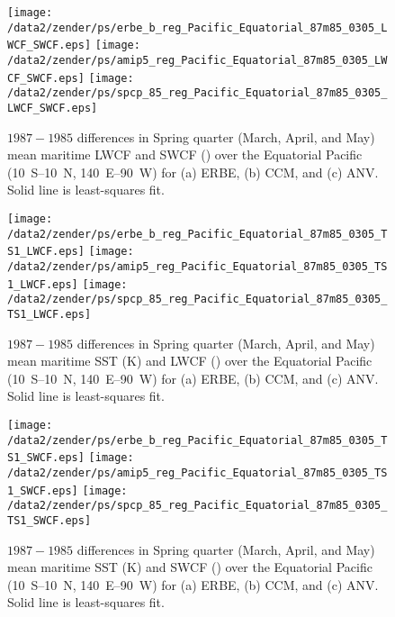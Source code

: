 \documentclass[twocolumn,final]{article}
\begin{document}
\begin{figure*}
\begin{center}
\texttt{[image: /data2/zender/ps/erbe\_b\_reg\_Pacific\_Equatorial\_87m85\_0305\_LWCF\_SWCF.eps]}%
\texttt{[image: /data2/zender/ps/amip5\_reg\_Pacific\_Equatorial\_87m85\_0305\_LWCF\_SWCF.eps]}%
\texttt{[image: /data2/zender/ps/spcp\_85\_reg\_Pacific\_Equatorial\_87m85\_0305\_LWCF\_SWCF.eps]}%
\end{center}
\caption[$1987-1985$ differences in Spring quarter (March, April, and
May) mean maritime LWCF and SWCF over the Equatorial Pacific for ERBE,
CCM, and ANV]{ 
$1987-1985$ differences in Spring quarter (March, April, and May) 
mean maritime LWCF and SWCF (\wxmS) over the Equatorial Pacific 
(10~\degreee S--10~\degreee N, 140~\degreee E--90~\degreee W)
for (a) ERBE, (b) CCM, and (c) ANV.
Solid line is least-squares fit.
\label{fig:reg_Pacific_Equatorial_87m85_0305_LWCF_SWCF}}   
\end{figure*}

\begin{figure*}
\begin{center}
\texttt{[image: /data2/zender/ps/erbe\_b\_reg\_Pacific\_Equatorial\_87m85\_0305\_TS1\_LWCF.eps]}%
\texttt{[image: /data2/zender/ps/amip5\_reg\_Pacific\_Equatorial\_87m85\_0305\_TS1\_LWCF.eps]}%
\texttt{[image: /data2/zender/ps/spcp\_85\_reg\_Pacific\_Equatorial\_87m85\_0305\_TS1\_LWCF.eps]}%
\end{center}
\caption[$1987-1985$ differences in Spring quarter (March, April, and May)
mean maritime SST and LWCF over the Equatorial Pacific for ERBE, CCM,
and ANV]{ 
$1987-1985$ differences in Spring quarter (March, April, and May)
mean maritime SST (\degreee K) and LWCF (\wxmS) over the Equatorial
Pacific  (10~\degreee S--10~\degreee N, 140~\degreee E--90~\degreee W)
for (a) ERBE, (b) CCM, and (c) ANV.
Solid line is least-squares fit.
\label{fig:reg_Pacific_Equatorial_87m85_0305_TS1_LWCF}}   
\end{figure*}

\begin{figure*}
\begin{center}
\texttt{[image: /data2/zender/ps/erbe\_b\_reg\_Pacific\_Equatorial\_87m85\_0305\_TS1\_SWCF.eps]}%
\texttt{[image: /data2/zender/ps/amip5\_reg\_Pacific\_Equatorial\_87m85\_0305\_TS1\_SWCF.eps]}%
\texttt{[image: /data2/zender/ps/spcp\_85\_reg\_Pacific\_Equatorial\_87m85\_0305\_TS1\_SWCF.eps]}%
\end{center}
\caption[$1987-1985$ differences in Spring quarter (March, April, and May)
mean maritime SST and SWCF over the Equatorial Pacific for ERBE, CCM,
and ANV]{ 
$1987-1985$ differences in Spring quarter (March, April, and May)
mean maritime SST (\degreee K) and SWCF (\wxmS) over the Equatorial
Pacific  (10~\degreee S--10~\degreee N, 140~\degreee E--90~\degreee W)
for (a) ERBE, (b) CCM, and (c) ANV.
Solid line is least-squares fit.
\label{fig:reg_Pacific_Equatorial_87m85_0305_TS1_SWCF}}   
\end{figure*}
\clearpage
\end{document}

